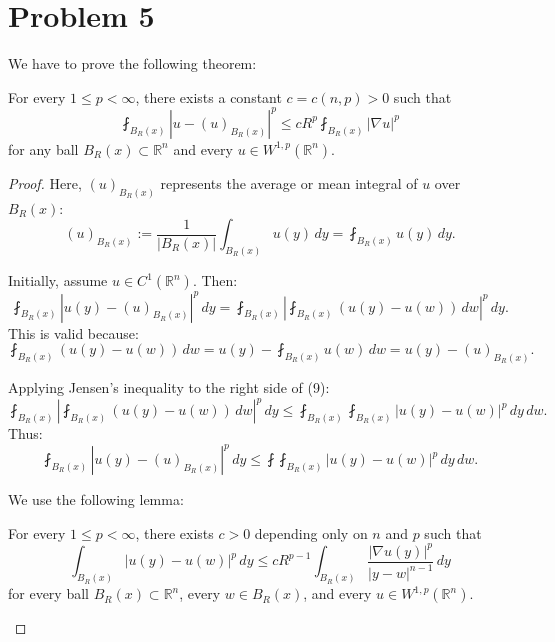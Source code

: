 \section{Problem 5}
We have to prove the following theorem:
\begin{theorem}
    For every $1\le p<\infty$, there exists a constant $c=c(n, p) >0$ such that
    \[
    \fint_{B_R(x)} \left|u - (u)_{B_R(x)}\right |^p \le cR^p \fint_{B_R(x)} |\nabla u|^p
    \]
    for any ball $B_R(x) \subset \mathbb{R}^n$ and every $u\in W^{1,p}(\mathbb{R}^n)$.
\end{theorem}

\begin{proof}
Here, $(u)_{B_R(x)}$ represents the average or mean integral of $u$ over $B_R(x)$:
\[
(u)_{B_R(x)} :=\frac{1}{|B_R(x)|}\int_{B_R(x)} u(y) \, dy
= \fint_{B_R(x)} u(y) \, dy.
\]

Initially, assume $u\in C^1(\mathbb{R}^n)$. Then:
\begin{equation}
\fint_{B_R(x)} |u(y) - (u)_{B_R(x)}|^p \, dy = \fint_{B_R(x)} \left|\fint_{B_R(x)} (u(y) - u(w)) \, dw\right|^p \, dy.
\end{equation}
This is valid because:
\[
\fint_{B_R(x)} (u(y)-u(w)) \, dw = u(y) - \fint_{B_R(x)} u(w) \, dw = u(y) -(u)_{B_R(x)}.
\]

Applying Jensen's inequality to the right side of (9):
\[
\fint_{B_R(x)} \left|\fint_{B_R(x)} (u(y) - u(w)) \, dw\right|^p \, dy \le \fint_{B_R(x)} \fint_{B_R(x)} |u(y) -u(w)|^p \, dy \, dw.
\]
Thus:
\begin{equation}
    \fint_{B_R(x)} |u(y) - (u)_{B_R(x)}|^p \, dy \le \fint \fint_{B_R(x)} |u(y) -u(w)|^p \, dy \, dw.
\end{equation}

We use the following lemma:
\begin{lemma}
    For every $1\le p < \infty$, there exists $c>0$ depending only on $n$ and $p$ such that 
    \[
    \int_{B_R(x)} |u(y)-u(w)|^p \, dy \le cR^{p-1}\int_{B_R(x)} \frac{|\nabla u(y)|^p}{|y-w|^{n-1}}\, dy
    \]
    for every ball $B_R(x) \subset \mathbb{R}^n$, every $w\in B_R(x)$, and every $u\in W^{1,p}(\mathbb{R}^n)$.
\end{lemma}


\end{proof}

